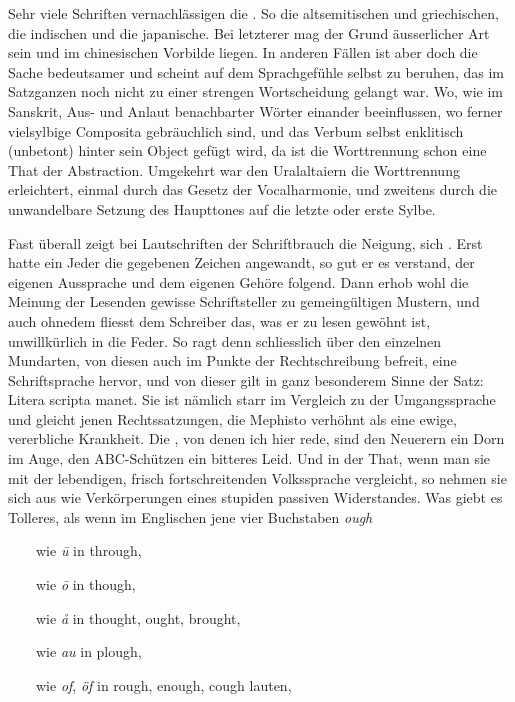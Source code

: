 Sehr viele Schriften vernachlässigen die . So die altsemitischen und griechischen, die indischen und die japanische. Bei letzterer mag der Grund äusserlicher Art sein und im chinesischen Vorbilde liegen. In anderen Fällen ist aber doch die Sache bedeutsamer und scheint auf dem Sprachgefühle selbst zu beruhen, das im Satzganzen noch nicht zu einer strengen Wortscheidung gelangt war. Wo, wie im Sanskrit, Aus- und Anlaut benachbarter Wörter einander beeinflussen, wo ferner vielsylbige Composita gebräuchlich sind, und das \label{fp.141} Verbum selbst enklitisch (unbetont) hinter sein Object gefügt wird, da ist die Worttrennung schon eine That der Abstraction. Umgekehrt war den Uralaltaiern die Worttrennung erleichtert, einmal durch das Gesetz der Vocalharmonie, und zweitens durch die unwandelbare Setzung des Haupttones auf die letzte oder erste Sylbe.

Fast überall zeigt bei Lautschriften der Schriftbrauch die Neigung, sich . Erst hatte ein Jeder die gegebenen Zeichen angewandt, so gut er es verstand, der eigenen Aussprache und dem eigenen Gehöre folgend. Dann erhob wohl die Meinung der Lesenden gewisse Schriftsteller zu gemeingültigen Mustern, und auch ohnedem fliesst dem Schreiber das, was er zu lesen gewöhnt ist, unwillkürlich in die Feder. So ragt denn schliesslich über den einzelnen Mundarten, von diesen auch im Punkte der Rechtschreibung befreit, eine Schriftsprache hervor, und von dieser gilt in ganz besonderem Sinne der Satz: Litera scripta manet. Sie ist nämlich starr im Vergleich zu der  Umgangssprache und gleicht jenen Rechtssatzungen, die Mephisto verhöhnt als eine ewige, vererbliche Krankheit. Die , von denen ich hier rede, sind den Neuerern ein Dorn im Auge, den ABC-Schützen ein bitteres Leid. Und in der That, wenn man sie mit der lebendigen, frisch fortschreitenden Volkssprache vergleicht, so nehmen sie sich aus wie Verkörperungen eines stupiden passiven Widerstandes. Was giebt es Tolleres, als wenn im Englischen jene vier Buchstaben \textit{ough}

~~~~wie \textit{ū} in through,

~~~~wie \textit{ō} in though,

~~~~wie \textit{å} in thought, ought, brought,

~~~~wie \textit{au} in plough,

~~~~wie \textit{of}, \textit{öf} in rough, enough, cough lauten,

